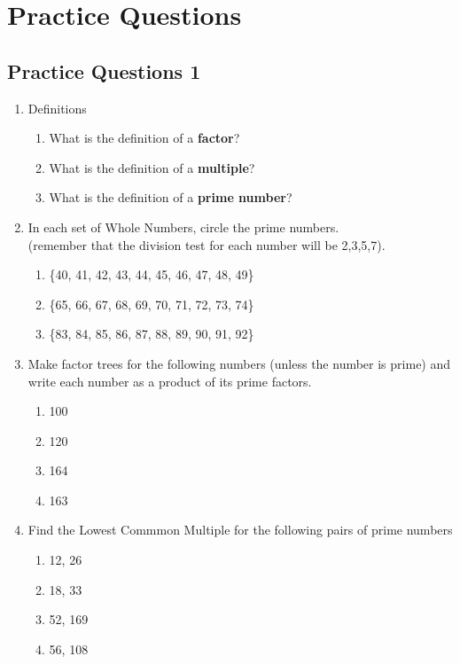 \documentclass[a4paper,12pt]{article}
\begin{document}
\section{Practice Questions}
\subsection{Practice Questions 1}
\newcommand{\wdth}{2}
\newcommand{\hght}{1}
\begin{enumerate}
	\item Definitions
	\begin{enumerate}
		\item What is the definition of a \textbf{factor}?
		\item What is the definition of a \textbf{multiple}?
		\item What is the definition of a \textbf{prime number}?
	\end{enumerate}
	\item In each set of Whole Numbers, circle the prime numbers.\\
	(remember that the division test for each number will be 2,3,5,7).
	\begin{enumerate}
		\item \{40, 41, 42, 43, 44, 45, 46, 47, 48, 49\}
		\item \{65, 66, 67, 68, 69, 70, 71, 72, 73, 74\}
		\item \{83, 84, 85, 86, 87, 88, 89, 90, 91, 92\}
	\end{enumerate} 
	\item Make factor trees for the following numbers (unless the number is prime) and write each number as a product of its prime factors.
	\begin{multicols}{4}
		\begin{enumerate}
			\item 100
			\item 120
			\item 164
			\item 163
		\end{enumerate}
	\end{multicols}
	\item Find the Lowest Commmon Multiple for the following pairs of prime numbers
	\begin{multicols}{5}
		\begin{enumerate}
			\item 12, 26
			\item 18, 33
			\item 52, 169
			\item 56, 108

\end{enumerate}
\end{multicols}
\end{enumerate}
\end{document}
